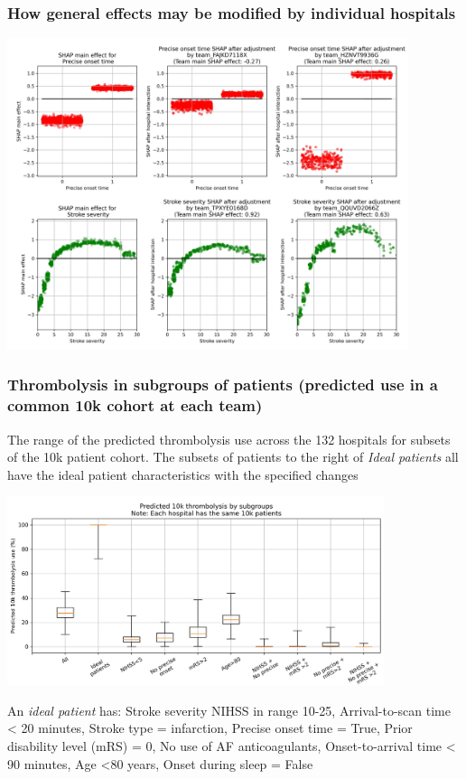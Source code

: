 \documentclass{beamer}
\begin{document}
\begin{frame}
\frametitle{How general effects may be modified by individual hospitals}

\begin{center}
\includegraphics[width=0.88\textwidth]{./images/12aa_two_way_shap_adjustment.jpg}
\end{center}
\end{frame}


\begin{frame}
\frametitle{Thrombolysis in subgroups of patients (predicted use in a common 10k cohort at each team)}

\footnotesize The range of the predicted thrombolysis use across the 132 hospitals for subsets of the 10k patient cohort. The subsets of patients to the right of \emph{Ideal patients} all have the ideal patient characteristics with the specified changes

\begin{center}
\includegraphics[width=0.83\textwidth]{./images/15c_modelled_subgroup_violin.jpg}
\end{center}

\scriptsize An \emph{ideal patient} has: Stroke severity NIHSS in range 10-25, Arrival-to-scan time \textless{} 20 minutes, Stroke type = infarction, Precise onset time = True, Prior disability level (mRS) = 0, No use of AF anticoagulants, Onset-to-arrival time \textless{} 90 minutes, Age \textless{80 years}, Onset during sleep = False
\end{frame}
\end{document}
